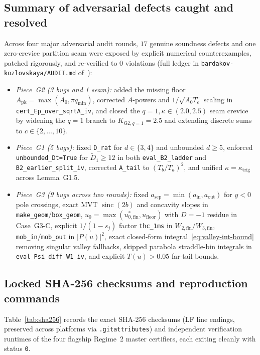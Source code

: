 \documentclass[10pt]{article}
\numberwithin{equation}{section}
\theoremstyle{plain}
\theoremstyle{definition}
\newcommand{\1}{\mathbf{1}}
\DeclareMathOperator{\sinc}{sinc}
\newcommand{\code}[1]{\texttt{#1}}
\begin{document}
\subsection{Summary of adversarial defects caught and resolved}
Across four major adversarial audit rounds, $17$ genuine soundness defects and one zero-crevice partition seam were exposed by explicit numerical counterexamples, patched rigorously, and re-verified to $0$ violations (full ledger in \code{bardakov-kozlovskaya/AUDIT.md} of~\cite{JadavRepo2026}):
\begin{itemize}[leftmargin=1.5em]
    \item \emph{Piece~G2 (3 bugs and 1 seam):} added the missing floor $A_{\mathrm{pk}} = \max(A_0, \pi q_{\min})$, corrected $A$-powers and $1/\sqrt{A_0 T_e}$ scaling in \code{cert\_Ep\_over\_sqrtA\_iv}, and closed the $q = 1, \kappa \in (2.0, 2.5)$ seam crevice by widening the $q = 1$ branch to $K_{\mathrm{G2},q=1} = 2.5$ and extending discrete sums to $c \in \{2, \dots, 10\}$.
    \item \emph{Piece~G1 (5 bugs):} fixed \code{D\_rat} for $d \in \{3, 4\}$ and unbounded $d \ge 5$, enforced \code{unbounded\_Dt=True} for $\tilde{D}_1 \ge 12$ in both \code{eval\_B2\_ladder} and \code{B2\_earlier\_split\_iv}, corrected \code{A\_tail} to $(T_b/T_a)^2$, and unified $\kappa = \kappa_{\mathrm{trig}}$ across Lemma~G1.5.
    \item \emph{Piece~G3 (9 bugs across two rounds):} fixed $a_{\mathrm{sep}} = \min(a_{\mathrm{in}}, a_{\mathrm{out}})$ for $y < 0$ pole crossings, exact MVT $\sinc(2b)$ and concavity slopes in \code{make\_geom}/\code{box\_geom}, $u_0 = \max(u_{0,\mathrm{fin}}^*, u_{\mathrm{floor}})$ with $D = -1$ residue in Case~G3-C, explicit $1/(1 - s_j)$ factor \code{thc\_1ms} in $W_{2,\mathrm{fin}}/W_{3,\mathrm{fin}}$, \code{mob\_in}/\code{mob\_out} in $|P(u)|^2$, exact closed-form integral~\eqref{eq:valley-int-bound} removing singular valley fallbacks, skipped parabola straddle-bin integrals in \code{eval\_Psi\_diff\_W1\_iv}, and explicit $T(u) > 0.05$ far-tail bounds.
\end{itemize}

\subsection{Locked SHA-256 checksums and reproduction commands}
Table~\ref{tab:sha256} records the exact SHA-256 checksums (LF line endings, preserved across platforms via \code{.gitattributes}) and independent verification runtimes of the four flagship Regime~2 master certifiers, each exiting cleanly with status \code{0}.
\end{document}
